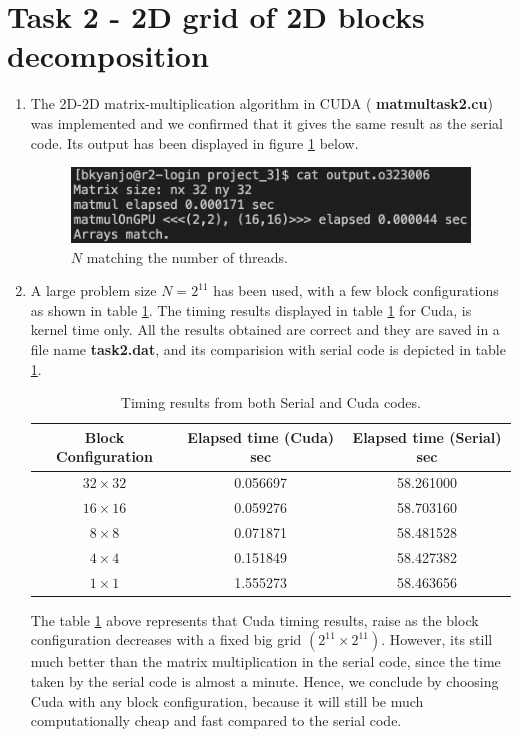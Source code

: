 \documentclass[12pt,a4paper]{article}
\begin{document}
\section*{Task 2 - 2D grid of 2D blocks decomposition}
\begin{enumerate}
	\item The 2D-2D matrix-multiplication algorithm in CUDA (\textbf{ matmul\textunderscore task2.cu}) was implemented and we confirmed that it gives the  same result as the serial code. Its output has been displayed in figure \ref{fig:t21} below.
	
	\begin{figure}[h]
		\centering
		\includegraphics[width=0.5\linewidth]{"t21"}
		\caption{$N$ matching the number of threads.}
		\label{fig:t21}
	\end{figure}
	
	\item A large problem size $N = 2 ^{11}$ has been used, with a few block configurations as shown in table \ref{table2}. The timing results displayed in table \ref{table2}  for Cuda, is kernel time only. All the results obtained are correct and they are saved in a file name \textbf{task2.dat}, and its comparision with serial code is depicted in table \ref{table2}.
		
	\begin{table}[H]
		\centering
	\begin{tabular}{|c|c|c|}
		\hline 
		\textbf{Block Configuration} & \textbf{Elapsed time (Cuda) sec}& \textbf{Elapsed time (Serial) sec} \\ 
		\hline 
		$32 \times 32$&0.056697  &58.261000  \\ 
		\hline 
		$16 \times 16$&0.059276  & 58.703160 \\ 
		\hline 
		$8 \times 8$& 0.071871 & 58.481528 \\ 
		\hline 
		$4 \times 4$&0.151849  &58.427382  \\ 
		\hline 
		$1 \times 1$&1.555273  & 58.463656 \\ 
		\hline 
	\end{tabular} 
	\caption{Timing results from both Serial and Cuda codes.}
	\label{table2}
	\end{table}
 The table \ref{table2} above represents that Cuda timing results, raise as the block configuration decreases with a fixed big grid $(2 ^{11} \times 2 ^{11})$. However, its still much better than the matrix multiplication in the serial code, since the time taken by the serial code is almost a minute. Hence, we conclude by choosing Cuda with any block configuration, because it will still be much computationally cheap and fast compared to the serial code.
 
\end{enumerate}
\end{document}
